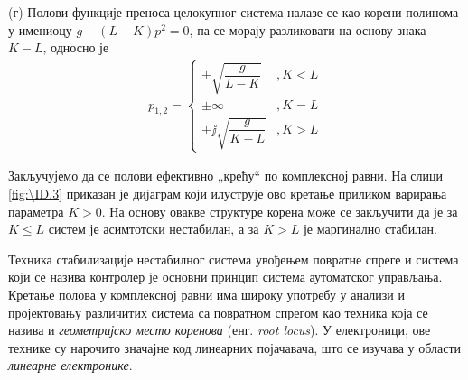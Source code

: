 (г) Полови функције преноса целокупног система налазе се као корени полинома у имениоцу $g - (L-K)p^2 = 0$, па се морају разликовати на основу 
знака $K-L$, односно је 
\begin{eqnarray}
    p_{1,2} = \begin{cases}
        \pm\sqrt{ \dfrac{g}{L-K} } &, K < L \\
        \pm\infty &, K = L \\
        \pm\jj\sqrt{\dfrac{g}{K-L}} &, K > L
    \end{cases}
\end{eqnarray}

Закључујемо да се полови ефективно „крећу“ по комплексној равни. На слици \ref{fig:\ID.3} приказан је дијаграм који илуструје ово кретање приликом 
варирања параметра $K > 0$. На основу овакве структуре корена може се закључити да је за 
$K \leq L$ систем је асимтотски нестабилан, а за $K > L$ је маргинално стабилан. 

Техника стабилизације нестабилног система увођењем повратне спреге и система који се назива контролер је основни принцип система 
аутоматског управљања. Кретање полова у комплексној равни има широку употребу у анализи и пројектовању различитих система са 
повратном спрегом као техника која се назива и \textit{геометријско место коренова} (енг. \textit{root locus}).
У електроници, ове технике су нарочито значајне код линеарних појачавача, што се изучава у области \textit{линеарне електронике}.
\clearpage